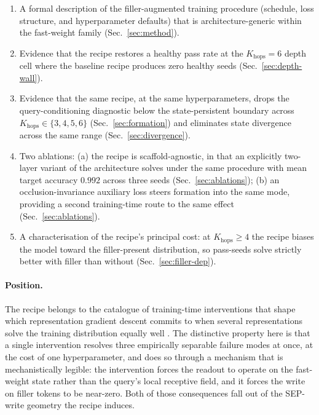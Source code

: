 \documentclass[11pt]{article}
\begin{document}
\begin{enumerate}
\item A formal description of the filler-augmented training procedure
      (schedule, loss structure, and hyperparameter defaults) that is
      architecture-generic within the fast-weight family
      (Sec.~\ref{sec:method}).
\item Evidence that the recipe restores a healthy pass rate at the
      $K_{\mathrm{hops}}=6$ depth cell where the baseline recipe
      produces zero healthy seeds (Sec.~\ref{sec:depth-wall}).
\item Evidence that the same recipe, at the same hyperparameters,
      drops the query-conditioning diagnostic below the
      state-persistent boundary across
      $K_{\mathrm{hops}} \in \{3, 4, 5, 6\}$ (Sec.~\ref{sec:formation})
      and eliminates state divergence across the same range
      (Sec.~\ref{sec:divergence}).
\item Two ablations: (a) the recipe is scaffold-agnostic, in that an
      explicitly two-layer variant of the architecture solves under
      the same procedure with mean target accuracy $0.992$ across
      three seeds (Sec.~\ref{sec:ablations}); (b) an occlusion-invariance
      auxiliary loss steers formation into the same mode, providing
      a second training-time route to the same effect
      (Sec.~\ref{sec:ablations}).
\item A characterisation of the recipe's principal cost: at
      $K_{\mathrm{hops}} \ge 4$ the recipe biases the model toward
      the filler-present distribution, so pass-seeds solve strictly
      better with filler than without (Sec.~\ref{sec:filler-dep}).
\end{enumerate}

\paragraph{Position.} The recipe belongs to the catalogue of
training-time interventions that shape which representation
gradient descent commits to when several representations solve the
training distribution equally well
\citep{wang2024grokked,olsson2022inductionheads,liu2023towards}. The
distinctive property here is that a single intervention resolves
three empirically separable failure modes at once, at the cost of
one hyperparameter, and does so through a mechanism that is
mechanistically legible: the intervention forces the readout to
operate on the fast-weight state rather than the query's local
receptive field, and it forces the write on filler tokens to be
near-zero. Both of those consequences fall out of the SEP-write
geometry the recipe induces.
\end{document}

